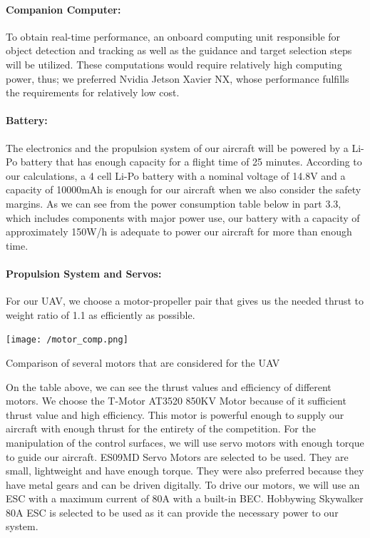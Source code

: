 \documentclass[12pt]{article}
\begin{document}
\paragraph*{Companion Computer:} To obtain real-time performance, an onboard computing unit responsible for object detection and tracking as well as the guidance and target selection steps will be utilized. These computations would require relatively high computing power, thus; we preferred Nvidia Jetson Xavier NX, whose performance fulfills the requirements for relatively low cost. 

\paragraph*{Battery:} The electronics and the propulsion system of our aircraft will be powered by a Li-Po battery that has enough capacity for a flight time of 25 minutes. According to our calculations, a 4 cell Li-Po battery with a nominal voltage of 14.8V and a capacity of 10000mAh is enough for our aircraft when we also consider the safety margins. As we can see from the power consumption table below in part 3.3, which includes components with major power use, our battery with a capacity of approximately 150W/h is adequate to power our aircraft for more than enough time.

\paragraph*{Propulsion System and Servos:} For our UAV, we choose a motor-propeller pair that gives us the needed thrust to weight ratio of 1.1 as efficiently as possible.
\begin{table}[ht]
 	\centering
 	\texttt{[image: /motor\_comp.png]}
 	\caption{Comparison of several motors that are considered for the UAV}
        \label{fig:budget}
 \end{table}
\FloatBarrier
\justify 
On the table above, we can see the thrust values and efficiency of different motors. We choose the T-Motor AT3520 850KV Motor because of it sufficient thrust value and high efficiency. This motor is powerful enough to supply our aircraft with enough thrust for the entirety of the competition. For the manipulation of the control surfaces, we will use servo motors with enough torque to guide our aircraft. ES09MD Servo Motors are selected to be used. They are small, lightweight and have enough torque. They were also preferred because they have metal gears and can be driven digitally. To drive our motors, we will use an ESC with a maximum current of 80A with a built-in BEC. Hobbywing Skywalker 80A ESC is selected to be used as it can provide the necessary power to our system.
\end{document}
